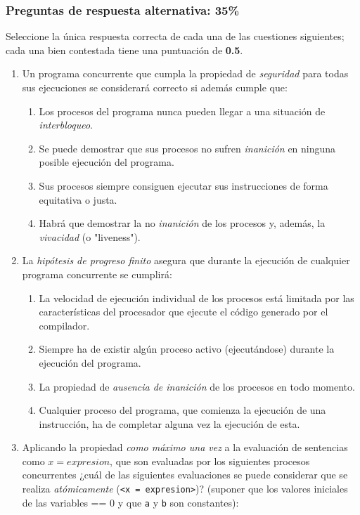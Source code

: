 \documentclass[12pt]{article}
\begin{document}
    \subsubsection*{Preguntas de respuesta alternativa: 35\%}
    \begin{ejercicio}
        Seleccione la única respuesta correcta de cada una de las cuestiones siguientes; cada una bien contestada tiene una puntuación de \textbf{0.5}.
        \begin{enumerate}
            \item Un programa concurrente que cumpla la propiedad de \textit{seguridad} para todas sus ejecuciones se considerará correcto si además cumple que:
                \begin{enumerate}[label=(\alph*)]
                    \item Los procesos del programa nunca pueden llegar a una situación de \textit{interbloqueo}.
                    \item Se puede demostrar que sus procesos no sufren \textit{inanición} en ninguna posible ejecución del programa.
                    \item Sus procesos siempre consiguen ejecutar sus instrucciones de forma equitativa o justa.
                    \item Habrá que demostrar la no \textit{inanición} de los procesos y, además, la \textit{vivacidad} (o "liveness").
                \end{enumerate}
            \item La \textit{hipótesis de progreso finito} asegura que durante la ejecución de cualquier programa concurrente se cumplirá:
                \begin{enumerate}[label=(\alph*)]
                    \item La velocidad de ejecución individual de los procesos está limitada por las características del procesador que ejecute el código generado por el compilador.
                    \item Siempre ha de existir algún proceso activo (ejecutándose) durante la ejecución del programa.
                    \item La propiedad de \textit{ausencia de inanición} de los procesos en todo momento.
                    \item Cualquier proceso del programa, que comienza la ejecución de una instrucción, ha de completar alguna vez la ejecución de esta.
                \end{enumerate}
            \item Aplicando la propiedad \textit{como máximo una vez} a la evaluación de sentencias como $x=expresion$, que son evaluadas por los siguientes procesos concurrentes ¿cuál de las siguientes evaluaciones se puede considerar que se realiza \textit{atómicamente} (\verb|<x = expresion>|)? (suponer que los valores iniciales de las variables == 0 y que \verb|a| y \verb|b| son constantes):

\end{enumerate}
\end{ejercicio}
\end{document}
